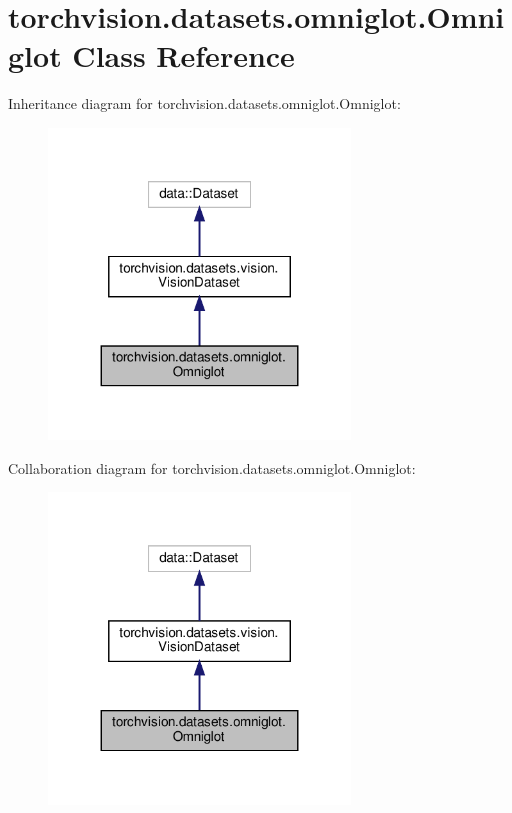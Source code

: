 \hypertarget{classtorchvision_1_1datasets_1_1omniglot_1_1Omniglot}{}\section{torchvision.\+datasets.\+omniglot.\+Omniglot Class Reference}
\label{classtorchvision_1_1datasets_1_1omniglot_1_1Omniglot}


Inheritance diagram for torchvision.\+datasets.\+omniglot.\+Omniglot\+:
\nopagebreak
\begin{figure}[H]
\begin{center}
\leavevmode
\includegraphics[width=227pt]{classtorchvision_1_1datasets_1_1omniglot_1_1Omniglot__inherit__graph}
\end{center}
\end{figure}


Collaboration diagram for torchvision.\+datasets.\+omniglot.\+Omniglot\+:
\nopagebreak
\begin{figure}[H]
\begin{center}
\leavevmode
\includegraphics[width=227pt]{classtorchvision_1_1datasets_1_1omniglot_1_1Omniglot__coll__graph}
\end{center}
\end{figure}
